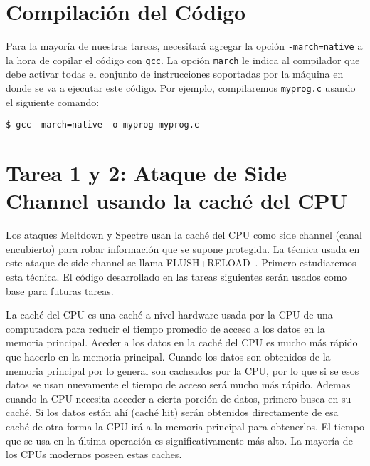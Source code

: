 
\section{Compilación del Código}
\label{sidechannel:sec:compilation}

Para la mayoría de nuestras tareas, necesitará agregar la opción \texttt{-march=native} a la hora de copilar el código con \texttt{gcc}. La opción \texttt{march} le indica al compilador que debe activar todas el conjunto de  instrucciones soportadas por la máquina en donde se va a ejecutar este código.
Por ejemplo, compilaremos \texttt{myprog.c} usando el siguiente comando:

\begin{lstlisting}
$ gcc -march=native -o myprog myprog.c
\end{lstlisting}



\section{Tarea 1 y 2: Ataque de Side Channel usando la caché del CPU}

Los ataques Meltdown y Spectre usan la caché del CPU como side channel (canal encubierto) para robar información que se supone protegida. La técnica usada en este ataque de side channel se llama FLUSH+RELOAD~\cite{Yarom2014}. 
Primero estudiaremos esta técnica. El código desarrollado en las tareas siguientes serán usados como base para futuras tareas.

La caché del CPU es una caché a nivel hardware usada por la CPU de una computadora para reducir el tiempo promedio de acceso a los datos en la memoria principal. Aceder a los datos en la caché del CPU es mucho más rápido que hacerlo en la memoria principal. Cuando los datos son obtenidos de la memoria principal por lo general son cacheados por la CPU, por lo que si se esos datos se usan nuevamente el tiempo de acceso será mucho más rápido. Ademas cuando la CPU necesita acceder a cierta porción de datos, primero busca en su caché. Si los datos están ahí (caché hit) serán obtenidos directamente de esa caché de otra forma la CPU irá a la memoria principal para obtenerlos. El tiempo que se usa en la última operación es significativamente más alto. La mayoría de los CPUs modernos poseen estas caches.


